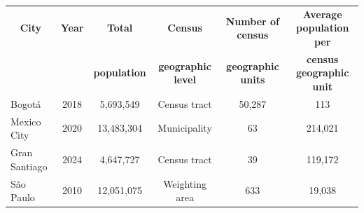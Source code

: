 \begin{tabular}{lccccc}
    \toprule
    \toprule
    \multicolumn{1}{c}{\textbf{City}} & \multicolumn{1}{c}{\textbf{Year}} & \multicolumn{1}{c}{\textbf{Total}} & \multicolumn{1}{c}{\textbf{Census}} & \multicolumn{1}{c}{\textbf{Number of census}} & \multicolumn{1}{c}{\textbf{Average population per}} \\
    & & \multicolumn{1}{c}{\textbf{population}} & \multicolumn{1}{c}{\textbf{geographic level}} & \multicolumn{1}{c}{\textbf{geographic units}} & \multicolumn{1}{c}{\textbf{census geographic unit}} \\
    \midrule
    Bogot\'a & 2018 & 5,693,549 & Census tract & 50,287 & 113 \\
    Mexico City & 2020 & 13,483,304 & Municipality & 63 & 214,021 \\
    Gran Santiago & 2024 & 4,647,727 & Census tract & 39 & 119,172 \\
    S\~ao Paulo & 2010 & 12,051,075 & Weighting area & 633 & 19,038 \\
    \bottomrule
    \bottomrule
\end{tabular}
